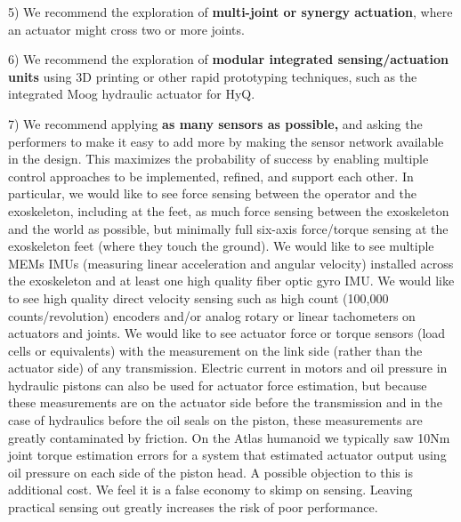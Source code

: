 \documentclass[letterpaper,12pt,fullpage]{article}
\begin{document}
5) We recommend the exploration of {\bf multi-joint or synergy actuation}, where an actuator
might cross two or more joints.

6) We recommend the exploration of {\bf modular integrated sensing/actuation units} using 3D printing
or other rapid prototyping techniques, such as the integrated Moog hydraulic
actuator for HyQ.

7) We recommend applying {\bf as many sensors as possible,} and asking the performers
to make it easy to add more by making the sensor network available in the design.
This maximizes the probability of success
by enabling multiple control
approaches to be implemented, refined, and support each other.
In particular, we would like to see force sensing between the operator and the
exoskeleton, including at the feet, as much force sensing between the exoskeleton 
and the world as possible, but minimally full six-axis force/torque sensing at
the exoskeleton feet (where they touch the ground). We would like to see multiple MEMs
IMUs (measuring linear acceleration and angular velocity) installed across 
the exoskeleton and at least one high quality fiber optic gyro IMU.
We would like to see high quality direct velocity sensing
such as high count (100,000 counts/revolution) encoders and/or 
analog rotary or linear tachometers on actuators and joints. 
We would like to see actuator force or torque sensors
(load cells or equivalents) with the measurement on the link side (rather than
the actuator side) of any transmission. Electric current in motors and oil
pressure in hydraulic pistons can also be used for actuator force estimation,
but because these measurements are on the actuator side before the transmission
and in the case of hydraulics before the oil seals on the piston, these measurements
are greatly contaminated by friction. On the Atlas humanoid we typically saw 10Nm
joint torque estimation errors for a system that estimated actuator output using
oil pressure on each side of the piston head.
A possible objection to this is additional cost. We feel it is a false
economy to skimp on sensing. Leaving practical sensing out greatly increases
the risk of poor performance.

%
%
\end{document}
